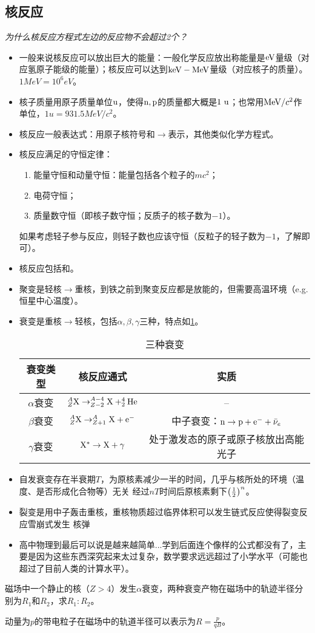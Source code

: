 \documentclass[a4paper,9pt]{ctexart}
\begin{document}
\subsection{核反应}
\emph{为什么核反应方程式左边的反应物不会超过2个？}
\begin{itemize}
\item
一般来说核反应可以放出巨大的能量：一般化学反应放出称能量是${\rm eV}$量级（对应氢原子能级的能量）；核反应可以达到${\rm keV} - {\rm MeV}$量级（对应核子的质量）。$1\unit{MeV} = 10^6 \unit{eV}$。
\item
核子质量用原子质量单位${\rm u}$，使得${\rm n,p}$的质量都大概是$1{\rm \ u}$；也常用${\rm MeV}/c^2$作单位，$1\unit{u} = 931.5\unit{MeV}/c^2$。
\item
核反应一般表达式：用原子核符号和$\to$表示，其他类似化学方程式。
\item
核反应满足的守恒定律：
\begin{enumerate}
\item
能量守恒和动量守恒：能量包括各个粒子的$mc^2$；
\item
电荷守恒；
\item
质量数守恒（即核子数守恒；反质子的核子数为$-1$）。
\end{enumerate}
如果考虑轻子参与反应，则轻子数也应该守恒（反粒子的轻子数为$-1$，了解即可）。
\item
核反应包括和。
\item
聚变是轻核$\to$重核，到铁之前到聚变反应都是放能的，但需要高温环境（e.g. 恒星中心温度）。
\item
衰变是重核$\to$轻核，包括$\alpha,\beta,\gamma$三种，特点如\cref{decaytab}。
\begin{table}[H]
\centering
\begin{tabular}{c|c|c}
衰变类型 & 核反应通式 & 实质 \\ \hline
$\alpha$衰变 & $^A_Z {\rm X} \to ^{A-4}_{Z-2} {\rm X} + ^4_2{\rm He}$ & -- \\ \hline
$\beta$衰变 & $^A_Z {\rm X} \to ^{A}_{Z+1} {\rm X} + {\rm e}^-$  & 中子衰变：${\rm n} \to {\rm p} +{\rm e}^- +\bar{\nu}_e$  \\ \hline
$\gamma$衰变 & ${\rm X}^* \to {\rm X} + \gamma$ & 处于激发态的原子或原子核放出高能光子 \\
\end{tabular}
\caption{三种衰变\label{decaytab}}
\end{table}
\item
自发衰变存在半衰期$T$，为原核素减少一半的时间，几乎与核所处的环境（温度、是否形成化合物等）无关 \so 经过$nT$时间后原核素剩下$\left( \frac{1}{2}\right)^{n}$。
\item
裂变是用中子轰击重核，重核物质超过临界体积可以发生链式反应使得裂变反应雪崩式发生 \so 核弹
\item
高中物理到最后可以说是越来越简单...学到后面连个像样的公式都没有了，主要是因为这些东西深究起来太过复杂，数学要求远远超过了小学水平（可能也超过了目前人类的计算水平）。
\end{itemize}
\begin{eg}
磁场中一个静止的核（$Z>4$）发生$\alpha$衰变，两种衰变产物在磁场中的轨迹半径分别为$R_1$和$R_2$，求$R_1:R_2$。
\end{eg}
\begin{ans}
动量为$p$的带电粒子在磁场中的轨道半径可以表示为$R = \frac{p}{qB}$。\vspace{2cm}
\end{ans}
\end{document}
